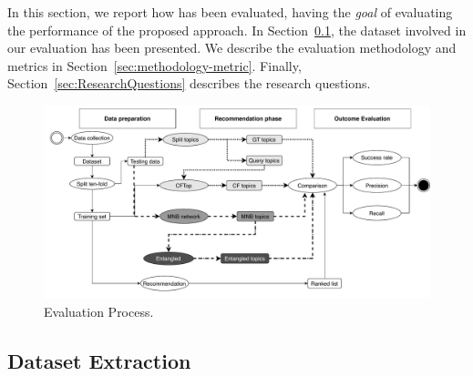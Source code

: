 





In this section, we report how \CT has been evaluated, having the {\em goal} of evaluating the performance of the proposed approach. In Section~\ref{sec:Dataset}, the dataset involved in our evaluation has been presented. We describe the evaluation methodology and metrics in Section~\ref{sec:methodology-metric}. Finally, Section~\ref{sec:ResearchQuestions} describes the research questions.



\begin{figure}[h!]
	\centering
	\includegraphics[width=0.9\linewidth,keepaspectratio]{figs/evaluationCF.pdf}
	\caption{Evaluation Process.}
	\label{fig:EvaluationProcess}
	\vspace{-.3cm}
\end{figure}

\subsection{Dataset Extraction} \label{sec:Dataset}



